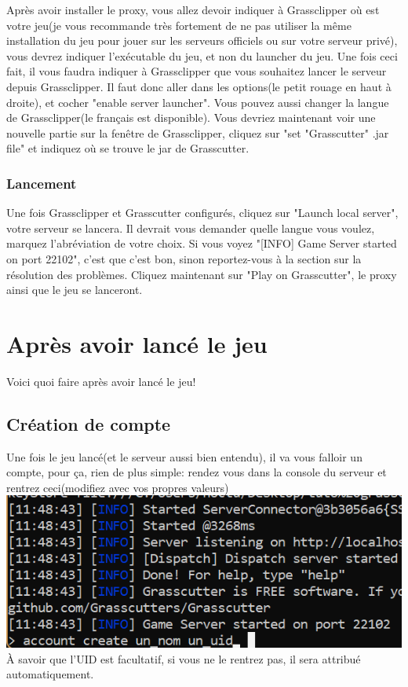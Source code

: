 \documentclass{article}
\begin{document}
Après avoir installer le proxy, vous allez devoir indiquer à Grassclipper où est votre jeu(je vous recommande très fortement de ne pas utiliser la même installation du jeu pour jouer sur les serveurs officiels ou sur votre serveur privé), vous devrez indiquer l'exécutable du jeu, et non du launcher du jeu.\newline
Une fois ceci fait, il vous faudra indiquer à Grassclipper que vous souhaitez lancer le serveur depuis Grassclipper. Il faut donc aller dans les options(le petit rouage en haut à droite), et cocher "enable server launcher". Vous pouvez aussi changer la langue de Grassclipper(le français est disponible).\newline
Vous devriez maintenant voir une nouvelle partie sur la fenêtre de Grassclipper, cliquez sur "set "Grasscutter" .jar file" et indiquez où se trouve le jar de Grasscutter. 

\subsubsection{Lancement}
Une fois Grassclipper et Grasscutter configurés, cliquez sur "Launch local server", votre serveur se lancera. Il devrait vous demander quelle langue vous voulez, marquez l'abréviation de votre choix. Si vous voyez "[INFO] Game Server started on port 22102", c'est que c'est bon, sinon reportez-vous à la section sur la résolution des problèmes.\newline
Cliquez maintenant sur "Play on Grasscutter", le proxy ainsi que le jeu se lanceront.

\section{Après avoir lancé le jeu}
Voici quoi faire après avoir lancé le jeu!

\subsection{Création de compte}
Une fois le jeu lancé(et le serveur aussi bien entendu), il va vous falloir un compte, pour ça, rien de plus simple: rendez vous dans la console du serveur et rentrez ceci(modifiez avec vos propres valeurs)\newline
\includegraphics[scale=0.8]{img/account_create.png}\newline
À savoir que l'UID est facultatif, si vous ne le rentrez pas, il sera attribué automatiquement.\newline\newline
\end{document}
